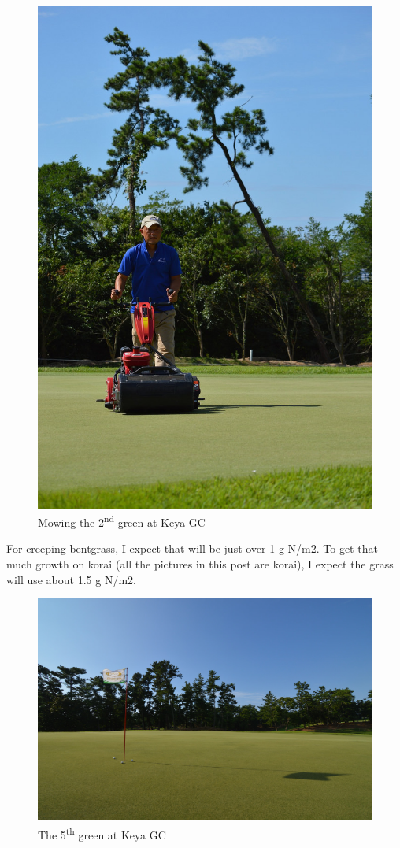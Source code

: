 \documentclass[12pt,b5,]{tufte-book}
\begin{document}
\begin{figure}
\centering
\includegraphics{img/b7-2.jpg}
\caption{Mowing the 2\textsuperscript{nd} green at Keya GC}
\end{figure}

For creeping bentgrass, I expect that will be just over 1 g N/m2. To get that much growth on korai (all the pictures in this post are korai), I expect the grass will use about 1.5 g N/m2.

\begin{figure}
\centering
\includegraphics{img/b7-3.jpg}
\caption{The 5\textsuperscript{th} green at Keya GC}
\end{figure}
\end{document}
